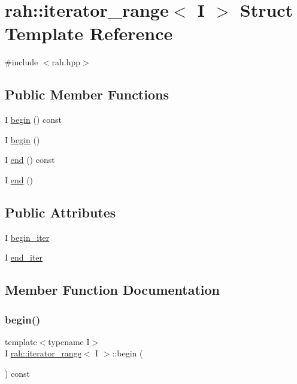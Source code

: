\hypertarget{structrah_1_1iterator__range}{}\section{rah\+::iterator\+\_\+range$<$ I $>$ Struct Template Reference}
\label{structrah_1_1iterator__range}


{\ttfamily \#include $<$rah.\+hpp$>$}

\subsection*{Public Member Functions}
\begin{DoxyCompactItemize}
\item 
I \mbox{\hyperlink{structrah_1_1iterator__range_a8e9c129ae0443c763ec87748add1b8fa}{begin}} () const
\item 
I \mbox{\hyperlink{structrah_1_1iterator__range_a1281848b740db43274f5be412c1a83f4}{begin}} ()
\item 
I \mbox{\hyperlink{structrah_1_1iterator__range_a8945eefba8353b52d0eaa97491d00ab3}{end}} () const
\item 
I \mbox{\hyperlink{structrah_1_1iterator__range_af0aabf4f87c49cc40e9877cbb296a926}{end}} ()
\end{DoxyCompactItemize}
\subsection*{Public Attributes}
\begin{DoxyCompactItemize}
\item 
I \mbox{\hyperlink{structrah_1_1iterator__range_a7c1da45d5ed07caead073472776cf298}{begin\+\_\+iter}}
\item 
I \mbox{\hyperlink{structrah_1_1iterator__range_aa9bfeef57b703dbdd5444afb426db863}{end\+\_\+iter}}
\end{DoxyCompactItemize}


\subsection{Member Function Documentation}
\mbox{\label{structrah_1_1iterator__range_a8e9c129ae0443c763ec87748add1b8fa}} 
\subsubsection{\texorpdfstring{begin()}{begin()}\hspace{0.1cm}{\footnotesize\ttfamily [1/2]}}
{\footnotesize\ttfamily template$<$typename I$>$ \\
I \mbox{\hyperlink{structrah_1_1iterator__range}{rah\+::iterator\+\_\+range}}$<$ I $>$\+::begin (\begin{DoxyParamCaption}{ }\end{DoxyParamCaption}) const\hspace{0.3cm}{\ttfamily [inline]}}

